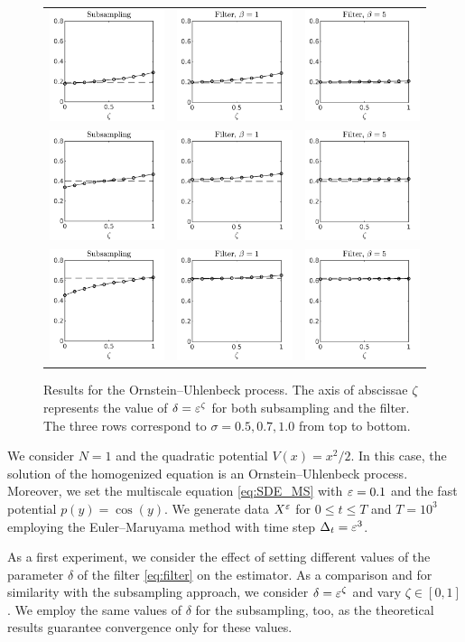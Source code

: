 \documentclass[10pt]{article}
\begin{document}
\begin{figure}[t]
	\centering
	\begin{tabular}{ccc}
		\includegraphics[]{Figures/OUSubs_s5} & \includegraphics[]{Figures/OUFilt_s5_b1}  & \includegraphics[]{Figures/OUFilt_s5_b5} \\ %
		\includegraphics[]{Figures/OUSubs_s7} & \includegraphics[]{Figures/OUFilt_s7_b1}  & \includegraphics[]{Figures/OUFilt_s7_b5} \\ %
		\includegraphics[]{Figures/OUSubs_s10} & \includegraphics[]{Figures/OUFilt_s10_b1}  & \includegraphics[]{Figures/OUFilt_s10_b5} %
	\end{tabular}
	\caption{Results for the Ornstein--Uhlenbeck process. The axis of abscissae $\zeta$ represents the value of $\delta = \varepsilon^\zeta$ for both subsampling and the filter. The three rows correspond to $\sigma = 0.5, 0.7, 1.0$ from top to bottom.}
	\label{fig:OU}
\end{figure}
We consider $N = 1$ and the quadratic potential $V(x) = x^2/2$. In this case, the solution of the homogenized equation is an Ornstein--Uhlenbeck process. Moreover, we set the multiscale equation \eqref{eq:SDE_MS} with $\varepsilon = 0.1$ and the fast potential $p(y) = \cos(y)$. We generate data $X^\varepsilon$ for $0 \leq t \leq T$ and $T = 10^3$ employing the Euler--Maruyama method with time step $\Delta_t = \varepsilon^3$. 

As a first experiment, we consider the effect of setting different values of the parameter $\delta$ of the filter \eqref{eq:filter} on the estimator. As a comparison and for similarity with the subsampling approach, we consider $\delta = \varepsilon^{\zeta}$ and vary $\zeta \in [0, 1]$. We employ the same values of $\delta$ for the subsampling, too, as the theoretical results guarantee convergence only for these values.
\end{document}
